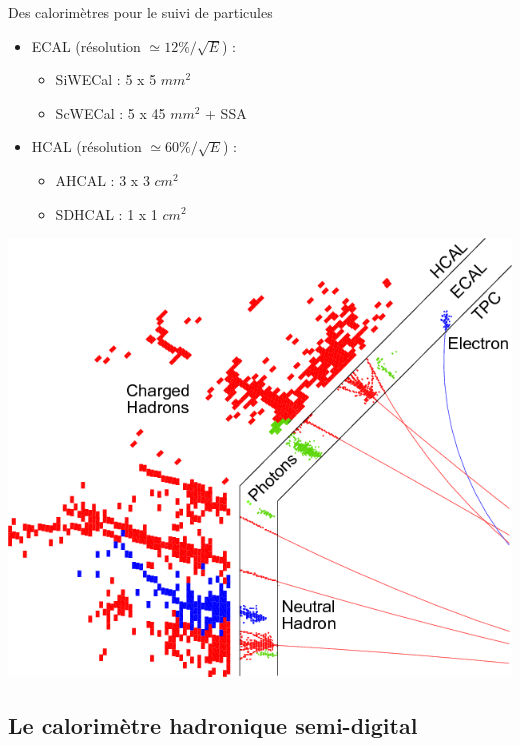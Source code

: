 \documentclass[8pt]{beamer}
\begin{document}
\begin{frame}
\begin{minipage}{0.36\linewidth}
    \end{minipage}
    \begin{minipage}[h]{0.5\linewidth}
      \begin{block}{Des calorimètres pour le suivi de particules}
        \begin{itemize}
          \item ECAL (résolution $\simeq 12\%/\sqrt{E}$) :
          \begin{itemize}
            \item SiWECal : 5 x 5 $mm^2$
            \item ScWECal : 5 x 45 $mm^2$ + SSA
          \end{itemize}
          \item HCAL (résolution $\simeq 60\%/\sqrt{E}$) :
          \begin{itemize}
            \item AHCAL : 3 x 3 $cm^2$
            \item SDHCAL : 1 x 1 $cm^2$
          \end{itemize}
        \end{itemize}
      \end{block}  
    \end{minipage} \hfill
    \begin{minipage}[h]{0.48\linewidth}
      \includegraphics[width=0.8\linewidth]{pfa_event_display.png}
    \end{minipage}
  \end{frame}

  \subsection{Le calorimètre hadronique semi-digital}
  
\end{document}
